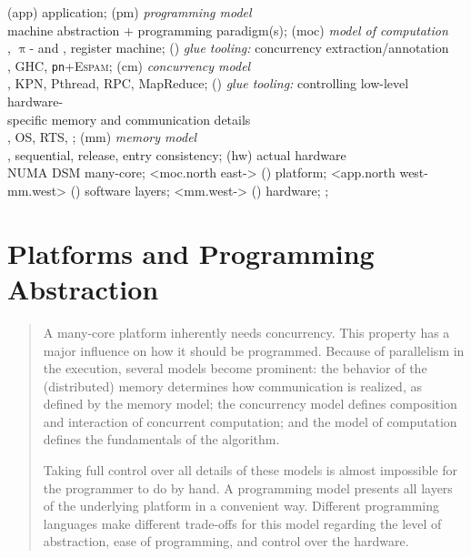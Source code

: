 \begin{chapterfig}
\label{fig:progmodel:overview}
\label{fig:progmodel:platform}
\setlength{\platformlayerwidth}{50ex}
\platformlayer[padded]						(app)	{
	\RaggedRight application};
				(pm)	{
	\RaggedRight\emph{programming model}\\
	machine abstraction + programming paradigm(s)};
				(moc)	{
	\RaggedRight\emph{model of computation}\\
	\eg, $\uppi$- and \lcalc, register machine};
\platformlayerglue[padded]					()		{
	\RaggedRight\emph{glue tooling:}
	concurrency extraction/annotation\\
	\eg, \acs{GHC}, \texttt{pn}+\textsc{Espam}};
				(cm)	{
	\RaggedRight\emph{concurrency model}\\
	\eg, \acs{KPN}, Pthread, \acs{RPC}, MapReduce};
\platformlayerglue[padded]					()		{
	\RaggedRight\emph{glue tooling:}
	controlling low-level hardware-\\specific memory and communication details\\
	\eg, \acs{OS}, \acl{RTS}, };
				(mm)	{
	\RaggedRight\emph{memory model}\\
	\eg, sequential, release, entry consistency};
\platformlayer[padded,minimum height=3.25em] (hw)	{
	\RaggedRight actual hardware\\
	\acs{NUMA} \acl{DSM} many-core};
\crosslayerright[] <moc.north east->		()		{platform};
\crosslayerleft[] <app.north west-mm.west>	() 		{software layers};
\crosslayerleft[] <mm.west->				() 		{hardware};
;
\end{chapterfig}

\chapter{Platforms and Programming Abstraction}%
\label{c:progmodel}

\begin{abstract}%
A many-core platform inherently needs concurrency.
This property has a major influence on how it should be programmed.
Because of parallelism in the execution, several models become prominent:
the behavior of the (distributed) memory determines how communication is realized, as defined by the memory model;
the concurrency model defines composition and interaction of concurrent computation;
and the model of computation defines the fundamentals of the algorithm.

Taking full control over all details of these models is almost impossible for the programmer to do by hand.
A programming model presents all layers of the underlying platform in a convenient way.
Different programming languages make different trade-offs for this model regarding the level of abstraction, ease of programming, and control over the hardware.
\end{abstract}


